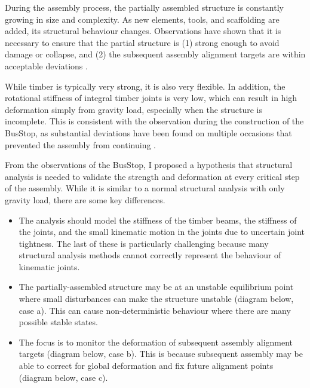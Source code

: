 During the assembly process, the partially assembled structure is constantly growing in size and complexity. As new elements, tools, and scaffolding are added, its structural behaviour changes. Observations have shown that it is necessary to ensure that the partial structure is (1) strong enough to avoid damage or collapse, and (2) the subsequent assembly alignment targets are within acceptable deviations . 

While timber is typically very strong, it is also very flexible. In addition, the rotational stiffness of integral timber joints is very low, which can result in high deformation simply from gravity load, especially when the structure is incomplete. This is consistent with the observation during the construction of the BusStop, as substantial deviations have been found on multiple occasions that prevented the assembly from continuing . 

From the observations of the BusStop, I proposed a hypothesis that structural analysis is needed to validate the strength and deformation at every critical step of the assembly. While it is similar to a normal structural analysis with only gravity load, there are some key differences. 

\begin{itemize}
	\item The analysis should model the stiffness of the timber beams, the stiffness of the joints, and the small kinematic motion in the joints due to uncertain joint tightness. The last of these is particularly challenging because many structural analysis methods cannot correctly represent the behaviour of kinematic joints. 

	\item The partially-assembled structure may be at an unstable equilibrium point where small disturbances can make the structure unstable (diagram below, case a). This can cause non-deterministic behaviour where there are many possible stable states.

	\item The focus is to monitor the deformation of subsequent assembly alignment targets (diagram below, case b). This is because subsequent assembly may be able to correct for global deformation and fix future alignment points (diagram below, case c).

\end{itemize}

